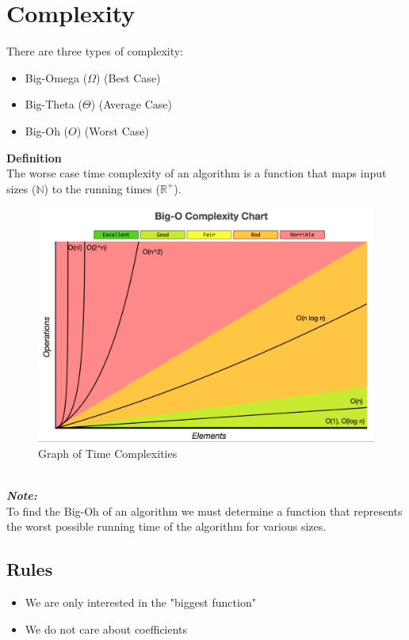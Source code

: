 \documentclass[hidelinks,11pt]{article}
\begin{document}
\section{Complexity}
There are three types of complexity:
\begin{itemize}
    \item Big-Omega ($\Omega$) (Best Case)
    \item Big-Theta ($\Theta$) (Average Case)
    \item Big-Oh ($O$) (Worst Case)
\end{itemize}
\textbf{Definition}\\
The worse case time complexity of an algorithm is a function that maps input sizes ($\mathbb N$) to the running times ($\mathbb R^+$).
\begin{figure}[h!]
    \centering
    \includegraphics[scale=0.25]{complexity.png}
    \caption{Graph of Time Complexities}
\end{figure}\\[0.5\baselineskip]
\textbf{\textit{Note:}}\\
To find the Big-Oh of an algorithm we must determine a function that represents the worst possible running time of the algorithm for various sizes.
\subsection{Rules}
\begin{itemize}
    \item We are only interested in the "biggest function"
    \item We do not care about coefficients
\end{itemize}
\end{document}

